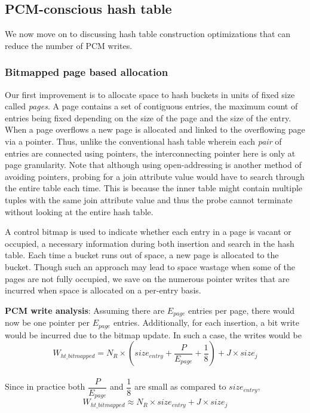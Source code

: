 \subsection{PCM-conscious hash table}
We now move on to discussing hash table construction optimizations that
can reduce the number of PCM writes.

\subsubsection{Bitmapped page based allocation}
Our first improvement is to allocate space to hash buckets in units of
fixed size called \textit{pages}. A page contains a set of contiguous
entries, the maximum count of entries being fixed depending on the size
of the page and the size of the entry. When a page overflows a new page
is allocated and linked to the overflowing page via a pointer.  Thus,
unlike the conventional hash table wherein each \emph{pair} of entries
are connected using pointers, the interconnecting pointer here is only
at page granularity. Note that although using open-addressing is another method of avoiding pointers, probing for a join attribute value would have to search through the entire table each time. This is because the inner table might contain multiple tuples with the same join attribute value and thus the probe cannot terminate without looking at the entire hash table.   

A control bitmap is used to indicate whether each entry in a page is vacant
or occupied, a necessary information during both insertion and search in the
hash table. Each time a bucket runs out of space, a new page is allocated
to the bucket. Though such an approach  may lead to space wastage when
some of the pages are not fully occupied, we save on the numerous pointer
writes that are incurred when space is allocated on a per-entry basis.

\textbf{PCM write analysis}: Assuming there are $E_{page}$ entries per page, there would now be one pointer per $E_{page}$ entries. Additionally, for each insertion, a bit write would be incurred due to the bitmap update. In such a case, the writes would be 
$$W_{ht\_bitmapped} = N_R \times (size_{entry} +  \frac{P}{E_{page}} + \frac{1}{8} ) + J \times size_{j}$$\\
Since in practice both  $\dfrac{P}{E_{page}}$ and $\dfrac{1}{8}$ are small as compared to $size_{entry}$, 
\begin{equation}\label{eq:ht_bmp}
 W_{ht\_bitmapped} \approx N_R \times size_{entry} + J \times size_{j} 
\end{equation} 


